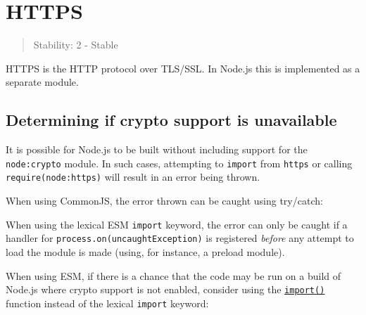 \section{HTTPS}\label{https}

\begin{quote}
Stability: 2 - Stable
\end{quote}

HTTPS is the HTTP protocol over TLS/SSL. In Node.js this is implemented
as a separate module.

\subsection{Determining if crypto support is
unavailable}\label{determining-if-crypto-support-is-unavailable}

It is possible for Node.js to be built without including support for the
\texttt{node:crypto} module. In such cases, attempting to
\texttt{import} from \texttt{https} or calling
\texttt{require(\textquotesingle{}node:https\textquotesingle{})} will
result in an error being thrown.

When using CommonJS, the error thrown can be caught using try/catch:

\begin{Shaded}
\begin{Highlighting}[]
\OperatorTok{;}
\NormalTok{ \{}
\OperatorTok{=} \NormalTok{(}\NormalTok{)}\OperatorTok{;}
\NormalTok{\} }
  \NormalTok{(}\NormalTok{)}\OperatorTok{;}
\NormalTok{\}}
\end{Highlighting}
\end{Shaded}

When using the lexical ESM \texttt{import} keyword, the error can only
be caught if a handler for
\texttt{process.on(\textquotesingle{}uncaughtException\textquotesingle{})}
is registered \emph{before} any attempt to load the module is made
(using, for instance, a preload module).

When using ESM, if there is a chance that the code may be run on a build
of Node.js where crypto support is not enabled, consider using the
\href{https://developer.mozilla.org/en-US/docs/Web/JavaScript/Reference/Operators/import}{\texttt{import()}}
function instead of the lexical \texttt{import} keyword:

